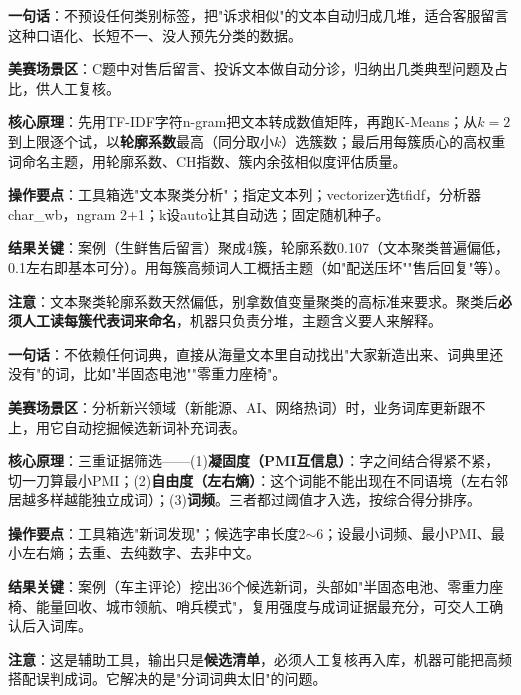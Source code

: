 
\begin{algobrief}
\textbf{一句话}：不预设任何类别标签，把"诉求相似"的文本自动归成几堆，适合客服留言这种口语化、长短不一、没人预先分类的数据。

\textbf{美赛场景区}：C题中对售后留言、投诉文本做自动分诊，归纳出几类典型问题及占比，供人工复核。

\textbf{核心原理}：先用TF-IDF字符n-gram把文本转成数值矩阵，再跑K-Means；从$k=2$到上限逐个试，以\textbf{轮廓系数}最高（同分取小$k$）选簇数；最后用每簇质心的高权重词命名主题，用轮廓系数、CH指数、簇内余弦相似度评估质量。

\textbf{操作要点}：工具箱选"文本聚类分析"；指定文本列；vectorizer选tfidf，分析器char\_wb，ngram 2+1；k设auto让其自动选；固定随机种子。

\textbf{结果关键}：案例（生鲜售后留言）聚成4簇，轮廓系数0.107（文本聚类普遍偏低，0.1左右即基本可分）。用每簇高频词人工概括主题（如"配送压坏""售后回复"等）。

\textbf{注意}：文本聚类轮廓系数天然偏低，别拿数值变量聚类的高标准来要求。聚类后\textbf{必须人工读每簇代表词来命名}，机器只负责分堆，主题含义要人来解释。
\end{algobrief}


\begin{algobrief}
\textbf{一句话}：不依赖任何词典，直接从海量文本里自动找出"大家新造出来、词典里还没有"的词，比如"半固态电池""零重力座椅"。

\textbf{美赛场景区}：分析新兴领域（新能源、AI、网络热词）时，业务词库更新跟不上，用它自动挖掘候选新词补充词表。

\textbf{核心原理}：三重证据筛选——(1)\textbf{凝固度（PMI互信息）}：字之间结合得紧不紧，切一刀算最小PMI；(2)\textbf{自由度（左右熵）}：这个词能不能出现在不同语境（左右邻居越多样越能独立成词）；(3)\textbf{词频}。三者都过阈值才入选，按综合得分排序。

\textbf{操作要点}：工具箱选"新词发现"；候选字串长度2$\sim$6；设最小词频、最小PMI、最小左右熵；去重、去纯数字、去非中文。

\textbf{结果关键}：案例（车主评论）挖出36个候选新词，头部如"半固态电池、零重力座椅、能量回收、城市领航、哨兵模式"，复用强度与成词证据最充分，可交人工确认后入词库。

\textbf{注意}：这是辅助工具，输出只是\textbf{候选清单}，必须人工复核再入库，机器可能把高频搭配误判成词。它解决的是"分词词典太旧"的问题。
\end{algobrief}
